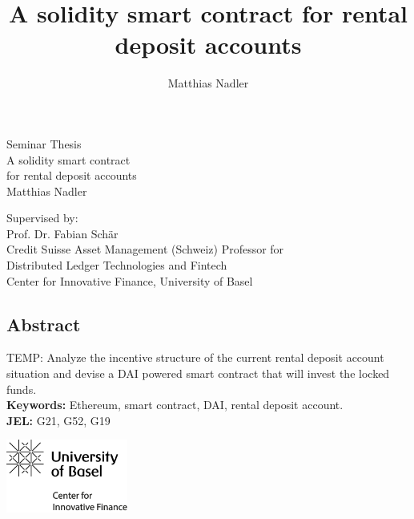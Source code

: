 \documentclass[12pt,a4paper,titlepage,oneside,english]{article}
\title{A solidity smart contract for rental deposit accounts}
\author{Matthias Nadler}
\begin{document}
\begin{center}
\vspace{1em}
\large{Seminar Thesis}\\
\huge A solidity smart contract \\
for rental deposit accounts \\
\Large \vspace{1em}
Matthias Nadler
\end{center}

\vspace{1em}
\normalsize
\begin{flushleft}
Supervised by:\\ 
Prof. Dr. Fabian Schär \\
Credit Suisse Asset Management (Schweiz) Professor for \\ 
Distributed Ledger Technologies and Fintech \\
Center for Innovative Finance, University of Basel
\end{flushleft}

\vspace{1em}
\onehalfspacing
\begin{center}
\section*{Abstract}
\end{center}
TEMP: Analyze the incentive structure of the current rental deposit account situation and devise
a DAI powered smart contract that will invest the locked funds. \\
\vfill
\textbf{Keywords:} Ethereum, smart contract, DAI, rental deposit account.\\
\noindent\textbf{JEL:} G21, G52, G19




\newpage
{}
\tableofcontents

\vfill
\begin{center}
\includegraphics[width=4cm]{../assetlib/images/logo_cif.png}
\end{center}
\singlespacing
\vspace{-1.5cm}
\end{document}
